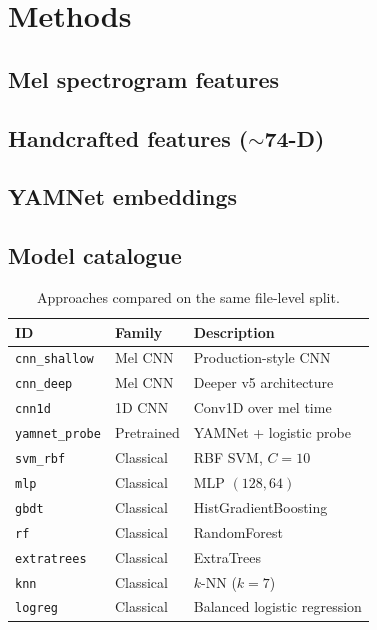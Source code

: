 \section{Methods}
\label{sec:methods}

\subsection{Mel spectrogram features}

\subsection{Handcrafted features ($\sim$74-D)}

\subsection{YAMNet embeddings}

\subsection{Model catalogue}
\begin{table}[H]
\centering
\caption{Approaches compared on the same file-level split.}
\label{tab:approaches}
\begin{tabular}{@{}llp{5.8cm}@{}}
\toprule
ID & Family & Description \\
\midrule
\texttt{cnn\_shallow} & Mel CNN & Production-style CNN \\
\texttt{cnn\_deep} & Mel CNN & Deeper v5 architecture \\
\texttt{cnn1d} & 1D CNN & Conv1D over mel time \\
\texttt{yamnet\_probe} & Pretrained & YAMNet + logistic probe \\
\texttt{svm\_rbf} & Classical & RBF SVM, $C=10$ \\
\texttt{mlp} & Classical & MLP $(128,64)$ \\
\texttt{gbdt} & Classical & HistGradientBoosting \\
\texttt{rf} & Classical & RandomForest \\
\texttt{extratrees} & Classical & ExtraTrees \\
\texttt{knn} & Classical & $k$-NN ($k=7$) \\
\texttt{logreg} & Classical & Balanced logistic regression \\
\bottomrule
\end{tabular}
\end{table}

